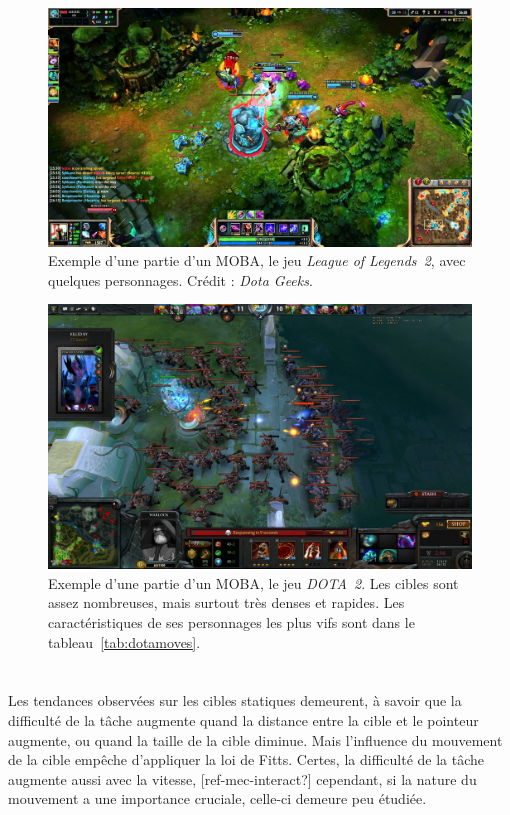 	\begin{figure}[ht]
		\centering
		\includegraphics[width=\textwidth]{figures/ch1/lol2}
		\caption{Exemple d'une partie d'un MOBA, le jeu \emph{League of Legends~2}, avec quelques personnages. Crédit : \emph{Dota Geeks}.}
		\label{fig:lol2}
	\end{figure}
	
	\begin{figure}[ht]
		\centering
		\includegraphics[width=\textwidth]{figures/ch1/dota2}
		\caption{Exemple d'une partie d'un MOBA, le jeu \emph{DOTA~2}. Les cibles sont assez nombreuses, mais surtout très denses et rapides. Les caractéristiques de ses personnages les plus vifs sont dans le tableau~\ref{tab:dotamoves}.}
		\label{fig:dota2}
	\end{figure}
	
	
	\section{}    
	Les tendances observées sur les cibles statiques demeurent, à savoir que la difficulté de la tâche augmente quand la distance entre la cible et le pointeur augmente, ou quand la taille de la cible diminue. Mais l'influence du mouvement de la cible empêche d'appliquer la loi de Fitts. Certes, la difficulté de la tâche augmente aussi avec la vitesse, [ref-mec-interact?] cependant, si la nature du mouvement a une importance cruciale, celle-ci demeure peu étudiée.
    
